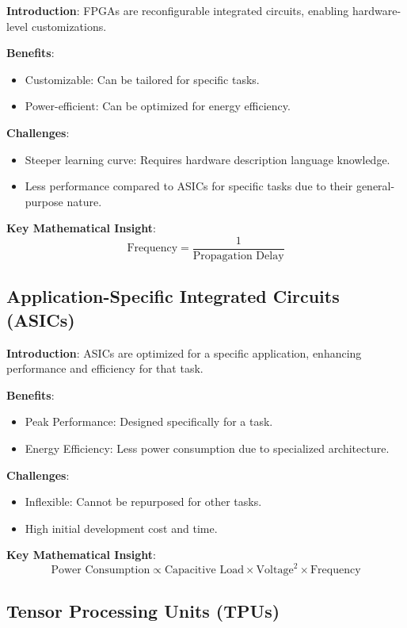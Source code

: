 \textbf{Introduction}: FPGAs are reconfigurable integrated circuits, enabling hardware-level customizations.

\textbf{Benefits}:
\begin{itemize}
	\item Customizable: Can be tailored for specific tasks.
	\item Power-efficient: Can be optimized for energy efficiency.
\end{itemize}

\textbf{Challenges}:
\begin{itemize}
	\item Steeper learning curve: Requires hardware description language knowledge.
	\item Less performance compared to ASICs for specific tasks due to their general-purpose nature.
\end{itemize}

\textbf{Key Mathematical Insight}:
\[ \text{Frequency} = \frac{1}{\text{Propagation Delay}} \]

\subsection{Application-Specific Integrated Circuits (ASICs)}

\textbf{Introduction}: ASICs are optimized for a specific application, enhancing performance and efficiency for that task.

\textbf{Benefits}:
\begin{itemize}
	\item Peak Performance: Designed specifically for a task.
	\item Energy Efficiency: Less power consumption due to specialized architecture.
\end{itemize}

\textbf{Challenges}:
\begin{itemize}
	\item Inflexible: Cannot be repurposed for other tasks.
	\item High initial development cost and time.
\end{itemize}

\textbf{Key Mathematical Insight}:
\[ \text{Power Consumption} \propto \text{Capacitive Load} \times \text{Voltage}^2 \times \text{Frequency} \]

\subsection{Tensor Processing Units (TPUs)}

